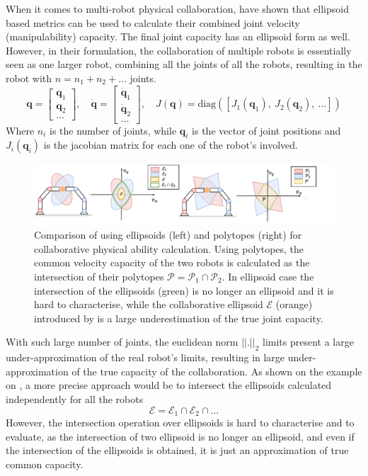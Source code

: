 When it comes to multi-robot physical collaboration, \citet{chiacchio_global_1991} have shown that ellipsoid based metrics can be used to calculate their combined joint velocity (manipulability) capacity. The final joint capacity has an ellipsoid form as well.  However, in their formulation, the collaboration of multiple robots is essentially seen as one larger robot, combining all the joints of all the robots, resulting in the robot with $n=n_1 + n_2 + \ldots$ joints.
\begin{equation}
    \bm{q} = \begin{bmatrix}
        \bm{q}_1\\ \bm{q}_2 \\ \ldots
    \end{bmatrix}, \quad
    \dot{\bm{q}} = \begin{bmatrix}
        \dot{\bm{q}}_1\\\dot{\bm{q}}_2 \\ \ldots
    \end{bmatrix}, \quad
    J(\bm{q}) = \text{diag}([J_1(\bm{q}_1),~ J_2(\bm{q}_2),~\ldots])
\end{equation} 
Where $n_i$ is the number of joints, while $\bm{q}_i$ is the vector of joint positions and $J_i(\bm{q}_i)$ is the jacobian matrix for each one of the robot's involved.

\begin{figure}[!h]
    \centering
    \includegraphics[width=1.05\linewidth]{Chapters/imgs/collab_manip_poly.pdf}
    \caption{Comparison of using ellipsoids (left) and polytopes (right) for collaborative physical ability calculation. Using polytopes, the common velocity capacity of the two robots is calculated as the intersection of their polytopes $\mathcal{P}=\mathcal{P}_1 \cap \mathcal{P}_2$. In ellipsoid case the intersection of the ellipsoids (green) is no longer an ellipsoid and it is hard to characterise, while the collaborative ellipsoid $\mathcal{E}$ (orange) introduced by \citet{chiacchio_global_1991} is a large underestimation of the true joint capacity.}
    \label{fig:collab_mani_poly}
\end{figure}
With such large number of joints, the euclidean norm $||.||_2$ limits present a large under-approximation of the real robot's limits, resulting in large under-approximation of the true capacity of the collaboration. As shown on the example on , a more precise approach would be to intersect the ellipsoids calculated independently for all the robots $$\mathcal{E}=\mathcal{E}_1 \cap \mathcal{E}_2  \cap \ldots$$ However, the intersection operation over ellipsoids is hard to characterise and to evaluate, as the intersection of two ellipsoid is no longer an ellipsoid, and even if the intersection of the ellipsoids is obtained, it is just an approximation of true common capacity. 

